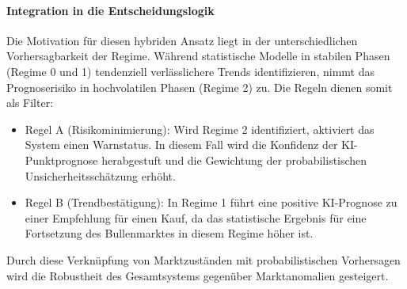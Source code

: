 \paragraph{Integration in die Entscheidungslogik}
Die Motivation für diesen hybriden Ansatz liegt in der unterschiedlichen Vorhersagbarkeit der Regime. Während statistische Modelle in stabilen Phasen (Regime 0 und 1) tendenziell verlässlichere Trends identifizieren, nimmt das Prognoserisiko in hochvolatilen Phasen (Regime 2) zu. Die Regeln dienen somit als Filter:
\begin{itemize}
    \item Regel A (Risikominimierung): Wird Regime 2 identifiziert, aktiviert das System einen Warnstatus. In diesem Fall wird die Konfidenz der KI-Punktprognose herabgestuft und die Gewichtung der probabilistischen Unsicherheitsschätzung erhöht.
    \item Regel B (Trendbestätigung): In Regime 1 führt eine positive KI-Prognose zu einer Empfehlung für einen Kauf, da das statistische Ergebnis für eine Fortsetzung des Bullenmarktes in diesem Regime höher ist.
\end{itemize}
Durch diese Verknüpfung von Marktzuständen mit probabilistischen Vorhersagen wird die Robustheit des Gesamtsystems gegenüber Marktanomalien gesteigert.
